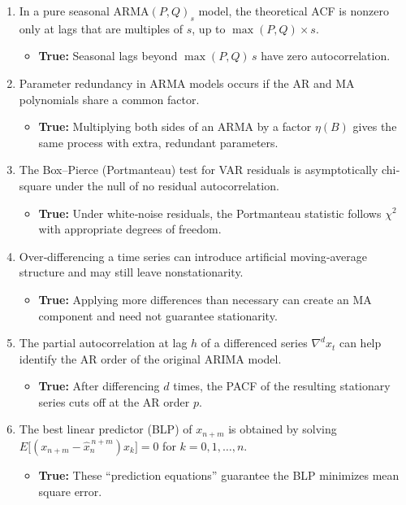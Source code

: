 \documentclass[11pt]{article}
\begin{document}
\begin{enumerate}
  \item In a pure seasonal ARMA\((P,Q)_s\) model, the theoretical ACF is nonzero only at lags that are multiples of \(s\), up to \(\max(P,Q)\times s\).
  \begin{itemize}
    \item \textbf{True:} Seasonal lags beyond \(\max(P,Q)\,s\) have zero autocorrelation.
  \end{itemize}

  \item Parameter redundancy in ARMA models occurs if the AR and MA polynomials share a common factor.
  \begin{itemize}
    \item \textbf{True:} Multiplying both sides of an ARMA by a factor \(\eta(B)\) gives the same process with extra, redundant parameters.
  \end{itemize}

  \item The Box–Pierce (Portmanteau) test for VAR residuals is asymptotically chi‐square under the null of no residual autocorrelation.
  \begin{itemize}
    \item \textbf{True:} Under white‐noise residuals, the Portmanteau statistic follows \(\chi^2\) with appropriate degrees of freedom.
  \end{itemize}

  \item Over‐differencing a time series can introduce artificial moving‐average structure and may still leave nonstationarity.
  \begin{itemize}
    \item \textbf{True:} Applying more differences than necessary can create an MA component and need not guarantee stationarity.
  \end{itemize}

  \item The partial autocorrelation at lag \(h\) of a differenced series \(\nabla^d x_t\) can help identify the AR order of the original ARIMA model.
  \begin{itemize}
    \item \textbf{True:} After differencing \(d\) times, the PACF of the resulting stationary series cuts off at the AR order \(p\).
  \end{itemize}

  \item The best linear predictor (BLP) of \(x_{n+m}\) is obtained by solving \(E\bigl[(x_{n+m}-\hat x_{n}^{\,n+m})x_k\bigr]=0\) for \(k=0,1,\dots,n\).
  \begin{itemize}
    \item \textbf{True:} These “prediction equations” guarantee the BLP minimizes mean square error.
  \end{itemize}


\end{enumerate}
\end{document}
